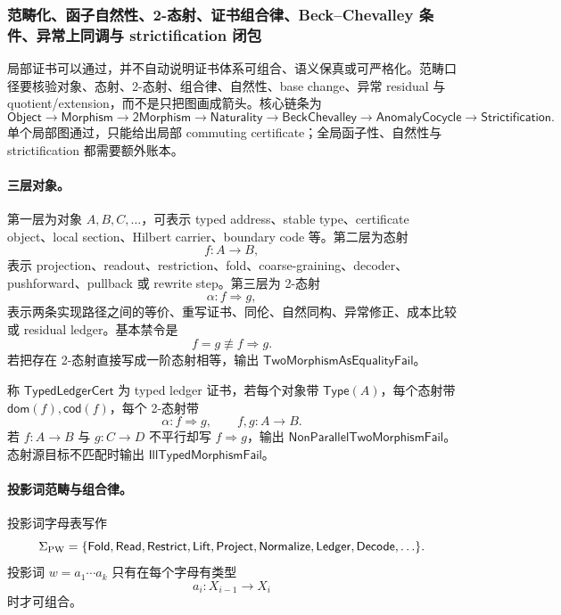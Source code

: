 \subsubsection{范畴化、函子自然性、2-态射、证书组合律、Beck--Chevalley 条件、异常上同调与 strictification 闭包}\label{subsubsec:typed-address-biaxial-completion-categorical-coherence-functoriality-strictification-closure}
局部证书可以通过，并不自动说明证书体系可组合、语义保真或可严格化。范畴口径要核验对象、态射、2-态射、组合律、自然性、base change、异常 residual 与 quotient/extension，而不是只把图画成箭头。核心链条为
\[
\boxed{
\mathsf{Object}
\to
\mathsf{Morphism}
\to
\mathsf{2Morphism}
\to
\mathsf{Naturality}
\to
\mathsf{BeckChevalley}
\to
\mathsf{AnomalyCocycle}
\to
\mathsf{Strictification}.
}
\]
单个局部图通过，只能给出局部 commuting certificate；全局函子性、自然性与 strictification 都需要额外账本。

\paragraph{三层对象。}
第一层为对象 \(A,B,C,\ldots\)，可表示 typed address、stable type、certificate object、local section、Hilbert carrier、boundary code 等。第二层为态射
\[
\boxed{f:A\to B,}
\]
表示 projection、readout、restriction、fold、coarse-graining、decoder、pushforward、pullback 或 rewrite step。第三层为 2-态射
\[
\boxed{\alpha:f\Rightarrow g,}
\]
表示两条实现路径之间的等价、重写证书、同伦、自然同构、异常修正、成本比较或 residual ledger。基本禁令是
\[
\boxed{
f=g\not\equiv f\Rightarrow g.
}
\]
若把存在 2-态射直接写成一阶态射相等，输出 \(\mathsf{TwoMorphismAsEqualityFail}\)。

\begin{definition}\label{def:typed-address-biaxial-completion-typed-ledger-cert}
称 \(\mathsf{TypedLedgerCert}\) 为 typed ledger 证书，若每个对象带 \(\mathsf{Type}(A)\)，每个态射带 \(\mathsf{dom}(f),\mathsf{cod}(f)\)，每个 2-态射带
\[
\alpha:f\Rightarrow g,\qquad f,g:A\to B.
\]
若 \(f:A\to B\) 与 \(g:C\to D\) 不平行却写 \(f\Rightarrow g\)，输出 \(\mathsf{NonParallelTwoMorphismFail}\)。态射源目标不匹配时输出 \(\mathsf{IllTypedMorphismFail}\)。
\end{definition}

\paragraph{投影词范畴与组合律。}
投影词字母表写作
\[
\Sigma_{\rm PW}
=
\{\mathsf{Fold},\mathsf{Read},\mathsf{Restrict},\mathsf{Lift},
\mathsf{Project},\mathsf{Normalize},\mathsf{Ledger},\mathsf{Decode},\ldots\}.
\]
投影词 \(w=a_1\cdots a_k\) 只有在每个字母有类型
\[
a_i:X_{i-1}\to X_i
\]
时才可组合。

